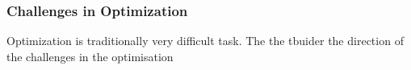 \subsubsection{Challenges in Optimization}

Optimization is traditionally very difficult task. The the tbuider the direction of the challenges in the optimisation 